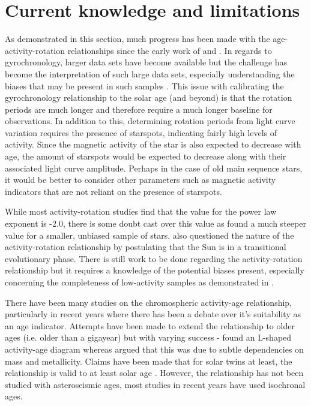 \section{Current knowledge and limitations}
As demonstrated in this section, much progress has been made with the age-activity-rotation relationships since the early work of \citet{Kraft_1967} and \citet{Skumanich_1972}. In regards to gyrochronology, larger data sets have become available but the challenge has become the interpretation of such large data sets, especially understanding the biases that may be present in such samples \citep{van_Saders_etal_2018}. This issue with calibrating the gyrochronology relationship to the solar age (and beyond) is that the rotation periods are much longer and therefore require a much longer baseline for observations. In addition to this, determining rotation periods from light curve variation requires the presence of starspots, indicating fairly high levels of activity. Since the magnetic activity of the star is also expected to decrease with age, the amount of starspots would be expected to decrease along with their associated light curve amplitude. Perhaps in the case of old main sequence stars, it would be better to consider other parameters such as magnetic activity indicators that are not reliant on the presence of starspots.

While most activity-rotation studies find that the value for the power law exponent is -2.0, there is some doubt cast over this value as \citet{Wright_etal_2011} found a much steeper value for a smaller, unbiased sample of stars. \citet{Metcalfe_etal_2016} also questioned the nature of the activity-rotation relationship by postulating that the Sun is in a transitional evolutionary phase. There is still work to be done regarding the activity-rotation relationship but it requires a knowledge of the potential biases present, especially concerning the completeness of low-activity samples as demonstrated in \citet{Wright_etal_2011}.

There have been many studies on the chromospheric activity-age relationship, particularly in recent years where there has been a debate over it's suitability as an age indicator. Attempts have been made to extend the relationship to older ages (i.e. older than a gigayear) but with varying success - \citet{Pace_2013} found an L-shaped activity-age diagram whereas \citet{Lorenzo_Oliveira_etal_2016} argued that this was due to subtle dependencies on mass and metallicity. Claims have been made that for solar twins at least, the relationship is valid to at least solar age \citep{Lorenzo_Oliveira_etal_2018}. However, the relationship has not been studied with asteroseismic ages, most studies in recent years have used isochronal ages.

